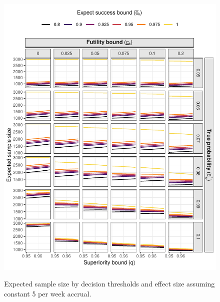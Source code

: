 \documentclass{article}
\begin{document}
\begin{figure}[!ht]
	\caption{Expected sample size by decision thresholds and effect size assuming constant 5 per week accrual.}
	\includegraphics{expected_ss_5.pdf}
	\label{fig:expected_ss_5}
\end{figure}
\end{document}
